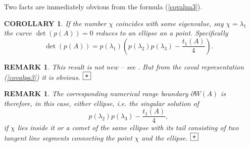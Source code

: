 \documentclass[10pt,a4paper,reqno]{amsart}
\newtheorem{dk}[defi]{\bf C\scriptsize OROLLARY \normalsize}
\newtheorem{rem}[defi]{\bf R\scriptsize EMARK \normalsize}
\def\kopr{\hfill\raisebox{3pt}{\framebox{$\star$}}}
\newenvironment{remark}{\begin{rem}\rm}{$\kopr$\end{rem}}
\newenvironment{corollary}{\begin{dk}\it}{\end{dk}}
\newcommand{\zav}[1]{\left( #1 \right)}
\newcommand{\deter}[1]{\det\zav{#1}}
\begin{document}
Two facts are immediately obvious from the formula (\ref{covalpa3}).
\begin{corollary}
If the number $\chi$ coincides with some eigenvalue, say $\chi=\lambda_1$
the curve $\deter{p(A)}=0$ reduces to an ellipse an a point. Specifically
$$
\deter{p(A)}=p(\lambda_1)\zav{p(\lambda_2)p(\lambda_3)-\frac{t_1(A)}{4}}.
$$
\end{corollary}
\begin{remark}
This result is not new -- see \cite[Theorem 2.2]{RodmanSpitkovsky}. But from the coval representation (\ref{covalpa3}) it is obvious.
\end{remark}
\begin{remark}
The corresponding numerical range boundary $\partial W(A)$ is therefore, in this case, either ellipse, i.e. the singular solution of
$$
p(\lambda_2)p(\lambda_3)-\frac{t_1(A)}{4},
$$
if $\chi$ lies inside it or a comet of the same ellipse with its tail consisting of two tangent line segments connecting the point $\chi$ and the ellipse. 
\end{remark}
\end{document}
